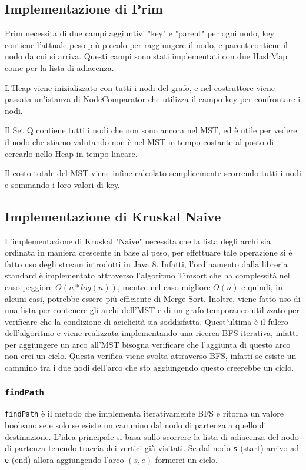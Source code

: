 \subsection{Implementazione di Prim}
Prim necessita di due campi aggiuntivi "key" e "parent" per ogni nodo, key contiene l'attuale peso più piccolo per raggiungere il nodo, e parent contiene il nodo da cui si arriva. Questi campi sono stati implementati con due HashMap come per la lista di adiacenza.

L'Heap viene inizializzato con tutti i nodi del grafo, e nel costruttore viene passata un'istanza di NodeComparator che utilizza il campo key per confrontare i nodi.

Il Set Q contiene tutti i nodi che non sono ancora nel MST, ed è utile per vedere il nodo che stiamo valutando non è nel MST in tempo costante al posto di cercarlo nello Heap in tempo lineare.

Il costo totale del MST viene infine calcolato semplicemente scorrendo tutti i nodi e sommando i loro valori di key.
\subsection{Implementazione di Kruskal Naive}
L'implementazione di Kruskal "Naive" necessita che la lista degli archi sia ordinata in maniera crescente in base al peso, per effettuare tale operazione si è fatto uso degli stream introdotti in Java 8. Infatti, l'ordinamento dalla libreria standard è implementato attraverso l'algoritmo Timsort che ha complessità  nel caso peggiore $O(n \ast log(n))$, mentre nel caso migliore $O(n)$ e quindi, in alcuni casi, potrebbe essere più efficiente di Merge Sort. Inoltre, viene fatto uso di una lista per contenere gli archi dell'MST e di un grafo temporaneo utilizzato per verificare che la condizione di aciclicità sia soddisfatta. Quest'ultima è il fulcro dell'algoritmo e viene realizzata implementando una ricerca BFS iterativa, infatti per aggiungere un arco all'MST bisogna verificare che l'aggiunta di questo arco non crei un ciclo. Questa verifica viene svolta attraverso BFS, infatti se esiste un cammino tra i due nodi dell'arco che sto aggiungendo questo creerebbe un ciclo.
\subsubsection{\texttt{findPath}}
\texttt{findPath} è il metodo che implementa iterativamente BFS e ritorna un valore booleano se e solo se esiste un cammino dal nodo di partenza a quello di destinazione. L'idea principale si basa sullo scorrere la lista di adiacenza del nodo di partenza tenendo traccia dei vertici già visitati. Se dal nodo \texttt{s} (start) arrivo ad \texttt{e} (end) allora aggiungendo l'arco $(s, e)$ formerei un ciclo.
